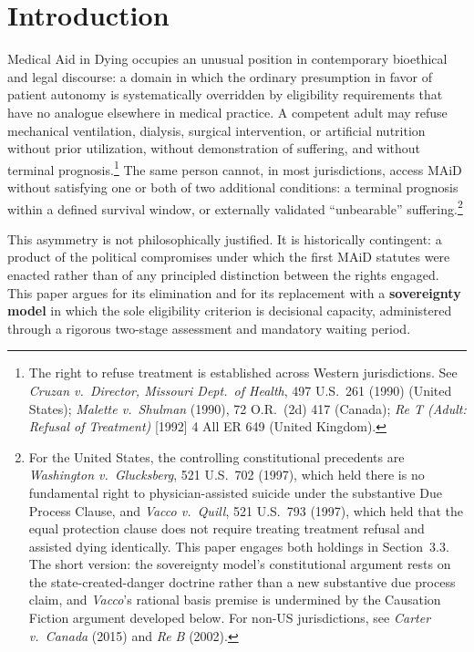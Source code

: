\documentclass[11pt, letterpaper]{article}
\begin{document}
\bigskip

\section{Introduction}

Medical Aid in Dying occupies an unusual position in contemporary bioethical and legal
discourse: a domain in which the ordinary presumption in favor of patient autonomy is
systematically overridden by eligibility requirements that have no analogue elsewhere in
medical practice. A competent adult may refuse mechanical ventilation, dialysis, surgical
intervention, or artificial nutrition without prior utilization, without demonstration of
suffering, and without terminal prognosis.\footnote{%
  The right to refuse treatment is established across Western jurisdictions. See
  \textit{Cruzan v.\ Director, Missouri Dept.\ of Health}, 497 U.S.\ 261 (1990)
  (United States); \textit{Malette v.\ Shulman} (1990), 72 O.R.\ (2d) 417 (Canada);
  \textit{Re T (Adult: Refusal of Treatment)} [1992] 4 All ER 649 (United Kingdom).}
The same person cannot, in most jurisdictions, access MAiD without satisfying one or both
of two additional conditions: a terminal prognosis within a defined survival window, or
externally validated ``unbearable'' suffering.\footnote{%
  For the United States, the controlling constitutional precedents are
  \textit{Washington v.\ Glucksberg}, 521 U.S.\ 702 (1997), which held there is no
  fundamental right to physician-assisted suicide under the substantive Due Process Clause,
  and \textit{Vacco v.\ Quill}, 521 U.S.\ 793 (1997), which held that the equal protection
  clause does not require treating treatment refusal and assisted dying identically. This
  paper engages both holdings in Section~3.3. The short version: the sovereignty model's
  constitutional argument rests on the state-created-danger doctrine rather than a new
  substantive due process claim, and \textit{Vacco}'s rational basis premise is undermined
  by the Causation Fiction argument developed below. For non-US jurisdictions, see
  \textit{Carter v.\ Canada} (2015) and \textit{Re B} (2002).}

This asymmetry is not philosophically justified. It is historically contingent: a product
of the political compromises under which the first MAiD statutes were enacted rather than
of any principled distinction between the rights engaged. This paper argues for its
elimination and for its replacement with a \textbf{sovereignty model} in which the sole
eligibility criterion is decisional capacity, administered through a rigorous two-stage
assessment and mandatory waiting period.
\end{document}
